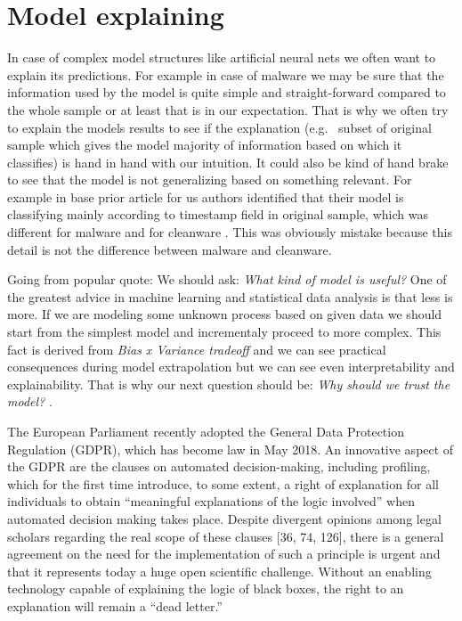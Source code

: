 \chapter{Model explaining} \label{chap:expth}
In case of complex model structures like artificial neural nets we often want to explain its predictions. For example in case of malware we may be sure that the information used by the model is quite simple and straight-forward compared to the whole sample or at least that is in our expectation. That is why we often try to explain the models results to see if the explanation (e.g. \ subset of original sample which gives the model majority of information based on which it classifies) is hand in hand with our intuition. It could also be kind of hand brake to see that the model is not generalizing based on something relevant. For example in base prior article for us authors identified that their model is classifying mainly according to timestamp field in original sample, which was different for malware and for cleanware \cite{Pevny2020}. This was obviously mistake because this detail is not the difference between malware and cleanware.

Going from popular quote:   We should ask: \emph{What kind of model is useful?}
One of the greatest advice in machine learning and statistical data analysis is that less is more. If we are modeling some unknown process based on given data we should start from the simplest model and incrementaly proceed to more complex. This fact is derived from \emph{Bias x Variance tradeoff}  and we can see practical consequences during model extrapolation but we can see even interpretability and explainability. That is why our next question should be: \emph{Why should we trust the model?} \cite{Ribeiro2016}.


The European Parliament recently adopted the General Data Protection Regulation (GDPR),
which has become law in May 2018. An innovative aspect of the GDPR are the clauses on automated decision-making, including profiling, which for the first time introduce, to some extent, a right of explanation for all individuals to obtain “meaningful explanations of the logic involved”
when automated decision making takes place. Despite divergent opinions among legal scholars
regarding the real scope of these clauses [36, 74, 126], there is a general agreement on the need for
the implementation of such a principle is urgent and that it represents today a huge open scientific
challenge. Without an enabling technology capable of explaining the logic of black boxes, the right
to an explanation will remain a “dead letter.” \cite{Guidotti2018}

